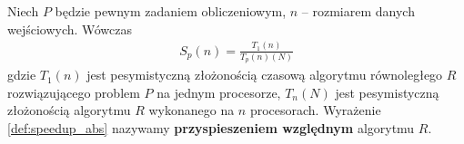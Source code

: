 \begin{definicja}
Niech \(P\) będzie pewnym zadaniem obliczeniowym, \(n\) -- rozmiarem danych wejściowych. Wówczas
\begin{align}\label{def:speedup_rel}
 S_{p}(n)=\frac{T_{1}(n)}{T_{p}(n)(N)}
\end{align}
gdzie \(T_{1}(n)\) jest pesymistyczną złożonością czasową algorytmu równoległego \(R\) rozwiązującego problem \(P\) na jednym procesorze, \(T_{n}(N)\) jest pesymistyczną złożonością algorytmu \(R\) wykonanego na \(n\) procesorach. Wyrażenie \ref{def:speedup_abs} nazywamy \textbf{przyspieszeniem względnym} algorytmu \(R\).
\end{definicja}